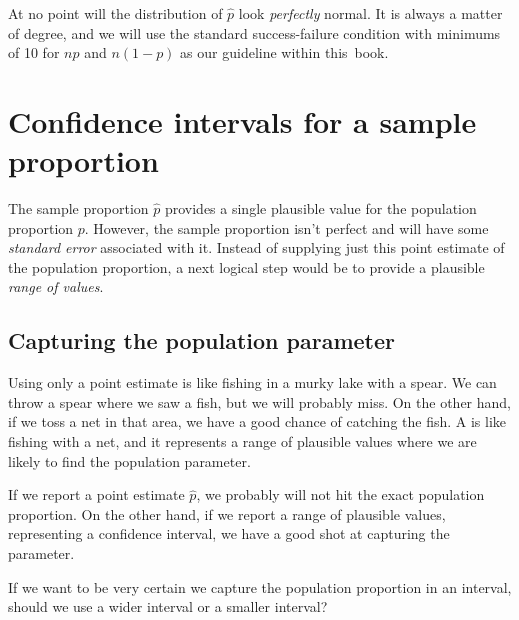 At no point will the distribution of $\hat{p}$ look
\emph{perfectly} normal.
It is always a matter of degree, and we will use
the standard success-failure condition with minimums
of 10 for $np$ and $n (1 - p)$ as our guideline
within this~book.




\section{Confidence intervals for a sample proportion}
\label{confidenceIntervals}


The sample proportion $\hat{p}$ provides a single plausible value
for the population proportion $p$. However, the sample proportion
isn't perfect and will have some \emph{standard error}
associated with it. Instead of supplying just this point estimate
of the population proportion, a next logical step would be
to provide a plausible \emph{range of values}.

\subsection{Capturing the population parameter}

Using only a point estimate is like fishing in a murky
lake with a spear. We can throw a spear where we
saw a fish, but we will probably miss. On the other hand,
if we toss a net in that area, we have a good chance of
catching the fish.
A  is like fishing with a net,
and it represents a range of plausible values where we
are likely to find the population parameter.

If we report a point estimate $\hat{p}$, we probably
will not hit the exact population proportion. On the
other hand, if we report a range of plausible values,
representing a confidence interval,
we have a good shot at capturing the parameter.

\begin{exercisewrap}
\begin{nexercise}
If we want to be very certain we capture the population
proportion in an interval, should we use a wider interval
or a smaller interval?\footnotemark
\end{nexercise}
\end{exercisewrap}

